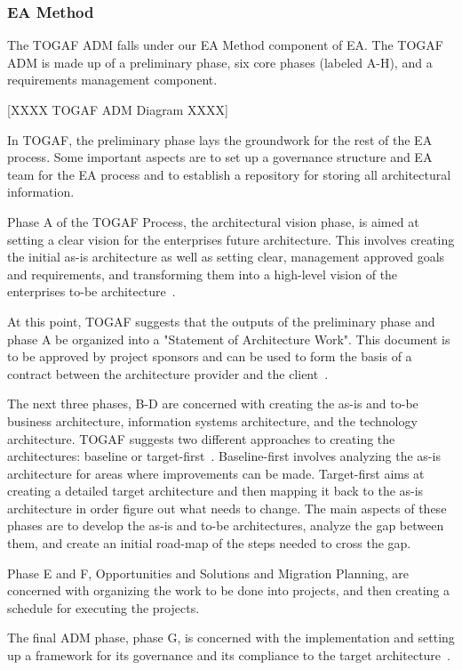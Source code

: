 \subsubsection{EA Method}
The TOGAF ADM falls under our EA Method component of EA. The TOGAF ADM is made up of a preliminary phase, six core phases (labeled A-H), and a requirements management component. 

[XXXX TOGAF ADM Diagram XXXX]

In TOGAF, the preliminary phase lays the groundwork for the rest of the EA process. Some important aspects are to set up a governance structure and EA team for the EA process and to establish a repository for storing all architectural information.~\cite{togaf9.1}

Phase A of the TOGAF Process, the architectural vision phase, is aimed at setting a clear vision for the enterprises future architecture. This involves creating the initial as-is architecture as well as setting clear, management approved goals and requirements, and transforming them into a high-level vision of the enterprises to-be architecture~\cite{togaf9.1}.

At this point, TOGAF suggests that the outputs of the preliminary phase and phase A be organized into a "Statement of Architecture Work". This document is to be approved by project sponsors and can be used to form the basis of a contract between the architecture provider and the client~\cite{togaf9.1}.

The next three phases, B-D are concerned with creating the as-is and to-be business architecture, information systems architecture, and the technology architecture. TOGAF suggests two different approaches to creating the architectures: baseline or target-first~\cite{togaf9.1}. Baseline-first involves analyzing the as-is architecture for areas where improvements can be made. Target-first aims at creating a detailed target architecture and then mapping it back to the as-is architecture in order figure out what needs to change. The main aspects of these phases are to develop the as-is and to-be architectures, analyze the gap between them, and create an initial road-map of the steps needed to cross the gap.

Phase E and F, Opportunities and Solutions and Migration Planning, are concerned with organizing the work to be done into projects, and then creating a schedule for executing the projects. 

The final ADM phase, phase G, is concerned with the implementation and setting up a framework for its governance and its compliance to the target architecture~\cite{togaf9.1}.

